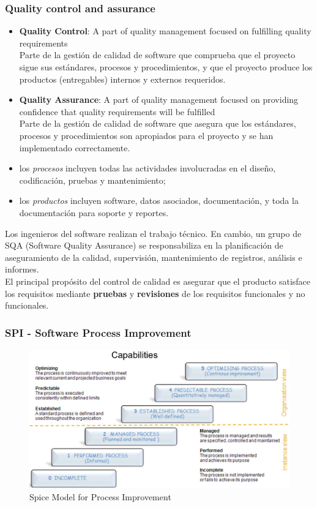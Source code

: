 \subsubsection{Quality control and assurance}
\begin{itemize}
   \item \textbf{Quality Control}: A part of quality management focused on fulfilling quality
   requirements\\
   Parte de la gestión de calidad de software que comprueba que el proyecto sigue sus estándares, procesos y procedimientos, y que el proyecto produce los productos (entregables) internos y externos requeridos.
   \item \textbf{Quality Assurance}: A part of quality management focused on providing confidence that quality requirements will be fulfilled\\
   Parte de la gestión de calidad de software que asegura que los estándares, procesos y procedimientos son apropiados para el proyecto y se han implementado correctamente.
\end{itemize}

\begin{itemize}
	\item los \textit{procesos} incluyen todas las actividades involucradas en el
diseño, codificación, pruebas y mantenimiento;
	\item los \textit{productos} incluyen software, datos asociados,
documentación, y toda la documentación para soporte y
reportes.
\end{itemize}

Los ingenieros del software realizan el trabajo técnico.
En cambio, un grupo de SQA (Software Quality Assurance) se responsabiliza en la planificación de aseguramiento de la calidad, supervisión, mantenimiento de registros, análisis e informes.\\
El principal propósito del control de calidad es asegurar que el producto satisface los requisitos mediante \textbf{pruebas} y \textbf{revisiones} de los requisitos funcionales y no funcionales.

\subsubsection{SPI - Software Process Improvement}

\begin{figure}[htbp]
   \centering
   \includegraphics{images/01/spice.png}
   \caption{Spice Model for Process Improvement}
   \label{fig:01/spice}
\end{figure}

